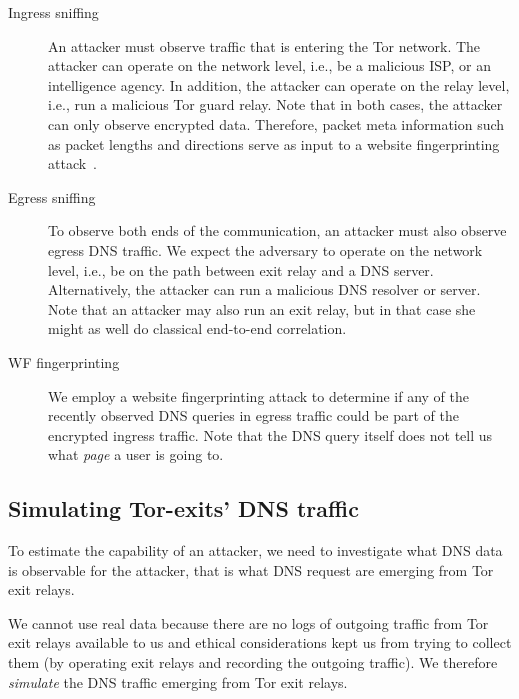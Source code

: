 \begin{description}
	\item[Ingress sniffing] An attacker must observe traffic that is entering
		the Tor network.  The attacker can operate on the network level, i.e.,
		be a malicious ISP, or an intelligence agency.  In addition, the
		attacker can operate on the relay level, i.e., run a malicious Tor guard
		relay.  Note that in both cases, the attacker can only observe encrypted
		data.  Therefore, packet meta information such as packet lengths and
		directions serve as input to a website fingerprinting
		attack~\cite{Panchenko2016a}.
	\item[Egress sniffing] To observe both ends of the communication, an
		attacker must also observe egress DNS traffic.  We expect the adversary
		to operate on the network level, i.e., be on the path between exit relay
		and a DNS server.  Alternatively, the attacker can run a malicious DNS
		resolver or server.  Note that an attacker may also run an exit relay,
		but in that case she might as well do classical end-to-end correlation.
	\item[WF fingerprinting] We employ a website fingerprinting attack to
		determine if any of the recently observed DNS queries in egress traffic
		could be part of the encrypted ingress traffic.  Note that the DNS query
		itself does not tell us what \emph{page} a user is going to.
\end{description}

\subsection{Simulating Tor-exits' DNS traffic}
To estimate the capability of an attacker, we need to investigate what
DNS data is observable for the attacker, that is what DNS request are
emerging from Tor exit relays.

We cannot use real data because there are no logs of outgoing traffic
from Tor exit relays available to us and ethical considerations kept us
from trying to collect them (\eg by operating exit relays and recording
the outgoing traffic). We therefore \emph{simulate} the DNS traffic
emerging from Tor exit relays.

